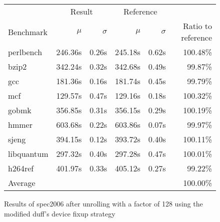\begin{figure}[h]
    \begin{center}
        \begin{tabular}{lrrrrr}
            \toprule
            & \multicolumn{2}{c}{Result} & \multicolumn{2}{c}{Reference}\\
            Benchmark & $\mu$ & $\sigma$ & $\mu$ & $\sigma$ & Ratio to reference\\
            \midrule
            perlbench & 246.36s & 0.26s & 245.18s & 0.62s & 100.48\%\\
            bzip2 & 342.24s & 0.32s & 342.68s & 0.49s & 99.87\%\\
            gcc & 181.36s & 0.16s & 181.74s & 0.45s & 99.79\%\\
            mcf & 129.57s & 0.47s & 129.16s & 0.18s & 100.32\%\\
            gobmk & 356.85s & 0.31s & 356.15s & 0.29s & 100.19\%\\
            hmmer & 603.68s & 0.22s & 603.86s & 0.07s & 99.97\%\\
            sjeng & 394.15s & 0.12s & 393.72s & 0.40s & 100.11\%\\
            libquantum & 297.32s & 0.40s & 297.28s & 0.47s & 100.01\%\\
            h264ref & 401.97s & 0.33s & 405.12s & 0.27s & 99.22\%\\
            \midrule
            Average & & & & & 100.00\%\\
            \bottomrule
        \end{tabular}
    \end{center}
    \caption{Results of spec2006 after unrolling with a factor of 128 using the modified duff's device fixup strategy}
    \label{fig:eval:perf:duff:128}
\end{figure}
